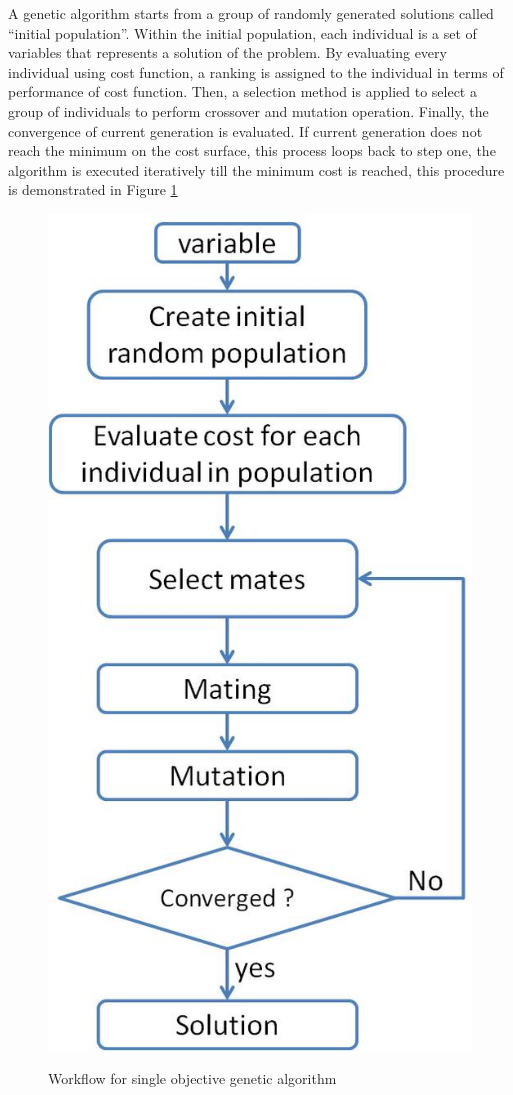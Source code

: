 A genetic algorithm starts from a group of randomly generated solutions called ``initial population''. Within the initial population, each individual is a set of variables that represents a solution of the problem. By evaluating every individual using cost function, a ranking is assigned to the individual in terms of performance of cost function. Then, a selection method is applied to select a group of individuals to perform crossover and mutation operation. Finally, the convergence of current generation is evaluated. If current generation does not reach the minimum on the cost surface, this process loops back to step one, the algorithm is executed iteratively till the minimum cost is reached, this procedure is demonstrated in Figure \ref{figure:GA_SO}

\begin{figure}[H]
	\centering
	\includegraphics[width=0.5\columnwidth]{../images/GA_SO_flowchart}\\[0.1cm]
    \caption[Single objective genetic algorithm]{Workflow for single objective genetic algorithm}
    \label{figure:GA_SO}
\end{figure}

